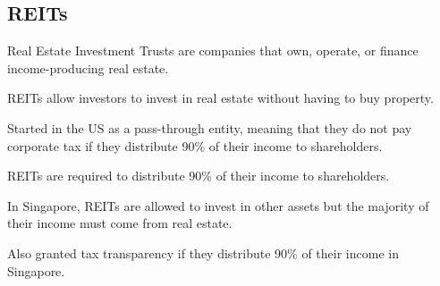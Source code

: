 \subsection{REITs}
Real Estate Investment Trusts are companies that own, operate, or finance income-producing real estate.

REITs allow investors to invest in real estate without having to buy property.

Started in the US as a pass-through entity, meaning that they do not pay corporate tax if they distribute 90\% of their income to shareholders.

REITs are required to distribute 90\% of their income to shareholders.

In Singapore, REITs are allowed to invest in other assets but the majority of their income must come from real estate.

Also granted tax transparency if they distribute 90\% of their income in Singapore.


